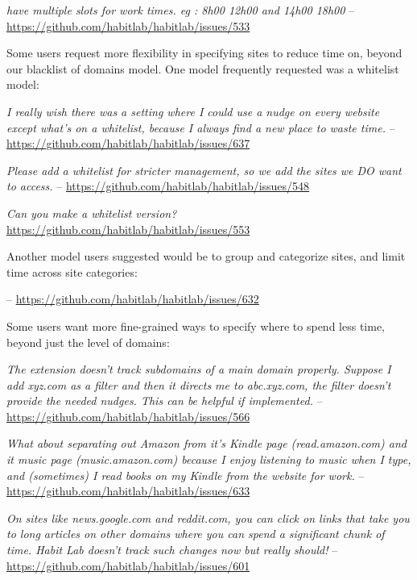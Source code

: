 \textit{have multiple slots for work times. eg : 8h00 12h00 and 14h00 18h00} -- \url{https://github.com/habitlab/habitlab/issues/533}

Some users request more flexibility in specifying sites to reduce time on, beyond our blacklist of domains model. One model frequently requested was a whitelist model:

\textit{I really wish there was a setting where I could use a nudge on every website except what's on a whitelist, because I always find a new place to waste time.} -- \url{https://github.com/habitlab/habitlab/issues/637}

\textit{Please add a whitelist for stricter management, so we add the sites we DO want to access.} -- \url{https://github.com/habitlab/habitlab/issues/548}

\textit{Can you make a whitelist version?} \url{https://github.com/habitlab/habitlab/issues/553}

Another model users suggested would be to group and categorize sites, and limit time across site categories:

 -- \url{https://github.com/habitlab/habitlab/issues/632}

Some users want more fine-grained ways to specify where to spend less time, beyond just the level of domains:

\textit{The extension doesn't track subdomains of a main domain properly. Suppose I add xyz.com as a filter and then it directs me to abc.xyz.com, the filter doesn't provide the needed nudges. This can be helpful if implemented.} -- \url{https://github.com/habitlab/habitlab/issues/566}

\textit{What about separating out Amazon from it's Kindle page (read.amazon.com) and it music page (music.amazon.com) because I enjoy listening to music when I type, and (sometimes) I read books on my Kindle from the website for work.} -- \url{https://github.com/habitlab/habitlab/issues/633}

\textit{On sites like news.google.com and reddit.com, you can click on links that take you to long articles on other domains where you can spend a significant chunk of time. Habit Lab doesn't track such changes now but really should!} -- \url{https://github.com/habitlab/habitlab/issues/601}

